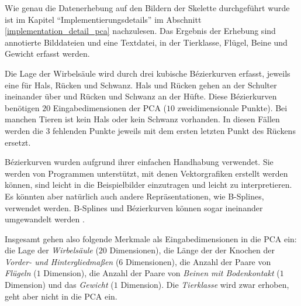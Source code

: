  Wie genau die Datenerhebung auf den Bildern der Skelette durchgeführt wurde ist im Kapitel "`Implementierungsdetails"' im Abschnitt \ref{implementation_detail_pca} nachzulesen.
 Das Ergebnis der Erhebung sind annotierte Bilddateien und eine Textdatei, in der Tierklasse, Flügel, Beine und Gewicht erfasst werden.
 
 Die Lage der Wirbelsäule wird durch drei kubische Bézierkurven erfasst, jeweils eine für Hals, Rücken und Schwanz. Hals und Rücken gehen an der Schulter ineinander über und Rücken und Schwanz an der Hüfte.
 Diese Bézierkurven benötigen $20$ Eingabedimensionen der PCA ($10$ zweidimensionale Punkte). Bei manchen Tieren ist kein Hals oder kein Schwanz vorhanden. In diesen Fällen werden die $3$ fehlenden Punkte jeweils mit dem ersten \bzw letzten Punkt des Rückens ersetzt.
 
 Bézierkurven wurden aufgrund ihrer einfachen Handhabung verwendet. Sie werden von Programmen unterstützt, mit denen Vektorgrafiken erstellt werden können, sind leicht in die Beispielbilder einzutragen und leicht zu interpretieren. Es könnten aber natürlich auch andere Repräsentationen, wie B-Splines, verwendet werden. B-Splines und Bézierkurven können sogar ineinander umgewandelt werden \cite{BezierAndBSplineTechniques}.
 
 Insgesamt gehen also folgende Merkmale als Eingabedimensionen in die PCA ein:
 die Lage der \emph{Wirbelsäule} ($20$ Dimensionen), die Länge der der Knochen der \emph{Vorder- und Hintergliedmaßen} ($6$ Dimensionen), die Anzahl der Paare von \emph{Flügeln} ($1$ Dimension), die Anzahl der Paare von \emph{Beinen mit Bodenkontakt} ($1$ Dimension) und das \emph{Gewicht} ($1$ Dimension). Die \emph{Tierklasse} wird zwar erhoben, geht aber nicht in die PCA ein.
 
